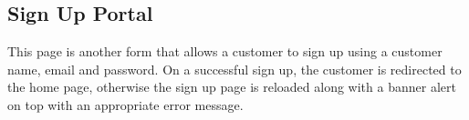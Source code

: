 \subsection{Sign Up Portal}
This page is another form that allows a customer to sign up using a customer name, email and password. On a successful sign up, the customer is redirected to the home page, otherwise the sign up page is reloaded along with a banner alert on top with an appropriate error message.

